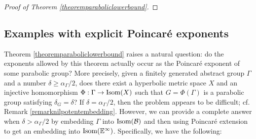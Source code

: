 \begin{proof}[Proof of Theorem \ref{theoremparaboliclowerbound}]
%
%
%
\end{proof}

\subsection{Examples with explicit Poincar\'e exponents}
\label{subsubsectiontheoremnilpotent}
Theorem \ref{theoremparaboliclowerbound} raises a natural question: do the exponents allowed by this theorem actually occur as the Poincar\'e exponent of some parabolic group? More precisely, given a finitely generated abstract group $\Gamma$ and a number $\delta \geq \alpha_\Gamma/2$, does there exist a hyperbolic metric space $X$ and an injective homomorphism $\Phi:\Gamma\to\operatorname{Isom}(X)$ such that $G = \Phi(\Gamma)$ is a parabolic group satisfying $\delta_G = \delta$? If $\delta = \alpha_\Gamma/2$, then the problem appears to be difficult; cf. Remark \ref{remarknilpotentembedding}. However, we can provide a complete answer when $\delta > \alpha_\Gamma/2$ by embedding $\Gamma$ into $\operatorname{Isom}(\mathcal B)$ and then using Poincar\'e extension to get an embedding into $\Isom(\E^\infty)$. Specifically, we have the following:




